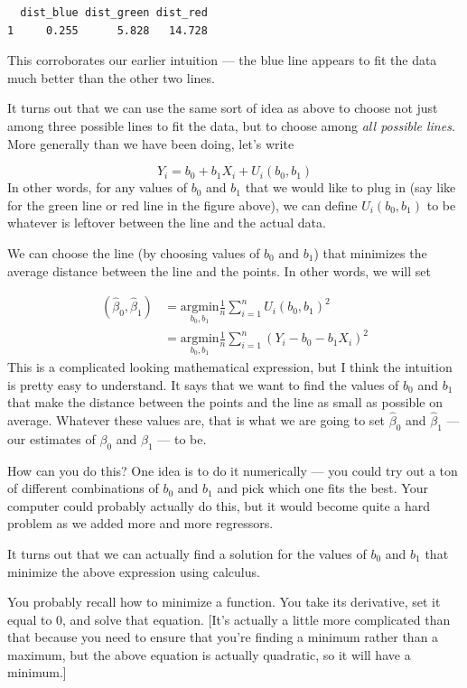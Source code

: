 \documentclass[
  letterpaper,
  DIV=11,
  numbers=noendperiod]{scrreprt}
\begin{document}
\begin{verbatim}
  dist_blue dist_green dist_red
1     0.255      5.828   14.728
\end{verbatim}

This corroborates our earlier intuition --- the blue line appears to fit
the data much better than the other two lines.

It turns out that we can use the same sort of idea as above to choose
not just among three possible lines to fit the data, but to choose among
\emph{all possible lines}. More generally than we have been doing, let's
write

\[
  Y_i = b_0 + b_1 X_i + U_i(b_0,b_1)
\] In other words, for any values of \(b_0\) and \(b_1\) that we would
like to plug in (say like for the green line or red line in the figure
above), we can define \(U_i(b_0,b_1)\) to be whatever is leftover
between the line and the actual data.

We can choose the line (by choosing values of \(b_0\) and \(b_1\)) that
minimizes the average distance between the line and the points. In other
words, we will set

\[
  \begin{aligned}
  (\hat{\beta}_0, \hat{\beta}_1) &= \underset{b_0,b_1}{\textrm{argmin}} \frac{1}{n} \sum_{i=1}^n U_i(b_0,b_1)^2 \\
  &= \underset{b_0,b_1}{\textrm{argmin}} \frac{1}{n} \sum_{i=1}^n (Y_i - b_0 - b_1 X_i)^2
  \end{aligned}
\] This is a complicated looking mathematical expression, but I think
the intuition is pretty easy to understand. It says that we want to find
the values of \(b_0\) and \(b_1\) that make the distance between the
points and the line as small as possible on average. Whatever these
values are, that is what we are going to set \(\hat{\beta}_0\) and
\(\hat{\beta}_1\) --- our estimates of \(\beta_0\) and \(\beta_1\) ---
to be.

How can you do this? One idea is to do it numerically --- you could try
out a ton of different combinations of \(b_0\) and \(b_1\) and pick
which one fits the best. Your computer could probably actually do this,
but it would become quite a hard problem as we added more and more
regressors.

It turns out that we can actually find a solution for the values of
\(b_0\) and \(b_1\) that minimize the above expression using calculus.

You probably recall how to minimize a function. You take its derivative,
set it equal to 0, and solve that equation. {[}It's actually a little
more complicated than that because you need to ensure that you're
finding a minimum rather than a maximum, but the above equation is
actually quadratic, so it will have a minimum.{]}
\end{document}
